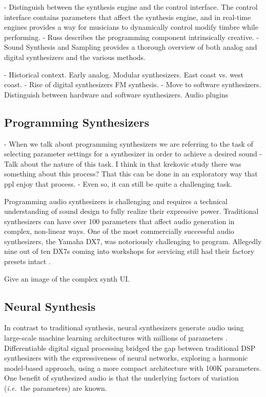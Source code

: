 - Distinguish between the synthesis engine and the control interface. The control interface contains parameters that affect the synthesis engine, and in real-time engines provides a way for musicians to dynamically control modify timbre while performing.
- Russ describes the programming component intrinsically creative.
- Sound Synthesis and Sampling provides a thorough overview of both analog and digital synthesizers and the various methods. \cite{russ2012sound}

- Historical context. Early analog. Modular synthesizers. East coast vs. west coast. 
- Rise of digital synthesizers FM synthesis.
- Move to software synthesizers. Distinguish between hardware and software synthesizers. Audio plugins

\subsection{Programming Synthesizers}
- When we talk about programming synthesizers we are referring to the task of selecting parameter settings for a synthesizer in order to achieve a desired sound
- Talk about the nature of this task. I think in that krekovic study there was something about this process? That this can be done in an exploratory way that ppl enjoy that process.
- Even so, it can still be quite a challenging task.

Programming audio synthesizers is challenging and requires a technical understanding of sound design to fully realize their expressive power. Traditional synthesizers can have over 100 parameters that affect audio generation in complex, non-linear ways. One of the most commercially successful audio synthesizers, the Yamaha DX7, was notoriously challenging to program. Allegedly nine out of ten DX7s coming into workshops for servicing still had their factory presets intact \cite{seago2004critical}.

Give an image of the complex synth UI.

\subsection{Neural Synthesis}
In contrast to traditional synthesis, neural synthesizers generate audio using large-scale machine learning architectures with millions of parameters \cite{engel2017neural}. Differentiable digital signal processing \cite{engel2020ddsp} bridged the gap between traditional DSP synthesizers with the expressiveness of neural networks, exploring a harmonic model-based approach, using a more compact architecture with 100K parameters.
One benefit of synthesized audio is that the underlying factors of variation ({\em i.e.}~the parameters) are known.

